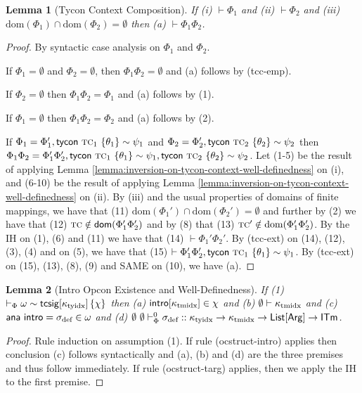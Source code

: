 \documentclass[12pt]{article}
\newtheorem{lemma}{Lemma}
\begin{document}
\begin{lemma}[Tycon Context Composition]
If (i) $\vdash \Phi_1$ and (ii) $\vdash \Phi_2$ and (iii) $\text{dom}(\Phi_1) \cap \text{dom}(\Phi_2) = \emptyset$ then (a) $\vdash \Phi_1\Phi_2$.
\end{lemma}
\begin{proof}
By syntactic case analysis on $\Phi_1$ and $\Phi_2$.

If $\Phi_1=\emptyset$ and $\Phi_2=\emptyset$, then $\Phi_1\Phi_2=\emptyset$ and (a) follows by (tcc-emp).

If $\Phi_2=\emptyset$ then $\Phi_1\Phi_2=\Phi_1$ and (a) follows by (1).

If $\Phi_1=\emptyset$ then $\Phi_1\Phi_2=\Phi_2$ and (a) follows by (2).

If $\Phi_1=\Phi_1', {\sf tycon}~\textsc{tc}_1 ~\{\theta_1\} \sim \psi_1$ and $\Phi_2=\Phi_2',{\sf tycon}~\textsc{tc}_2 ~\{\theta_2\} \sim \psi_2$ then $\Phi_1\Phi_2=\Phi_1'\Phi_2',{\sf tycon}~\textsc{tc}_1 ~\{\theta_1\} \sim \psi_1,{\sf tycon}~\textsc{tc}_2 ~\{\theta_2\} \sim \psi_2$. Let (1-5) be the result of applying Lemma \ref{lemma:inversion-on-tycon-context-well-definedness} on (i), and (6-10) be the result of applying Lemma \ref{lemma:inversion-on-tycon-context-well-definedness} on (ii). By (iii) and the usual properties of domains of finite mappings, we have that (11) $\text{dom}(\Phi_1') \cap \text{dom}(\Phi_2') = \emptyset$ and further by (2) we have that (12) $\textsc{tc}\notin{\sf dom}(\Phi_1'\Phi_2')$ and by (8) that (13) $\textsc{tc}'\notin\text{dom}({\Phi_1'\Phi_2'})$.  By the IH on (1), (6) and (11) we have that (14) $\vdash \Phi_1'\Phi_2'$. By (tcc-ext) on (14), (12), (3), (4) and  on (5), we have that (15) $\vdash \Phi_1'\Phi_2', {\sf tycon}~\textsc{tc}_1 ~\{\theta_1\} \sim \psi_1$. By (tcc-ext) on (15), (13), (8), (9) and SAME on (10), we have (a).
\end{proof}

\begin{lemma}[Intro Opcon Existence and Well-Definedness]
If (1) $\vdash_\Phi \omega \sim {\sf tcsig}[\kappa_\text{tyidx}]\,\{\chi\}$ then (a) ${\sf intro}[\kappa_\text{tmidx}] \in \chi$ and (b) $\emptyset \vdash \kappa_\text{tmidx}$ and (c) ${\sf ana~intro}=\sigma_\text{def}\in\omega$ and (d) $\emptyset~\emptyset \vdash_{\Phi}^{0} \sigma_\text{def} :: \kappa_\text{tyidx} \rightarrow \kappa_\text{tmidx} \rightarrow {\sf List}[{\sf Arg}] \rightarrow {\sf ITm}$.
\end{lemma}
\begin{proof}
Rule induction on assumption (1). If rule (ocstruct-intro) applies then conclusion (c) follows syntactically and (a), (b) and (d) are the three premises and thus follow immediately. If rule (ocstruct-targ) applies, then we apply the IH to the first premise.
\end{proof}
\end{document}
